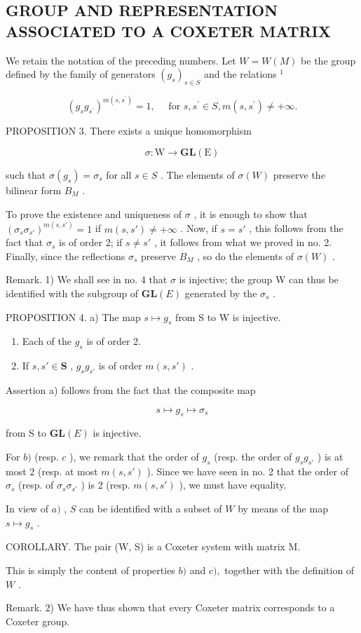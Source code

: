 \subsection{GROUP AND REPRESENTATION ASSOCIATED TO A COXETER MATRIX}

We retain the notation of the preceding numbers. Let \(W = W(M)\) be the group defined by the family of generators \((g_{s})_{s \in S}\) and the relations \(^{1}\)

\[
\left(g _ {s} g _ {s ^ {\prime}}\right) ^ {m \left(s, s ^ {\prime}\right)} = 1, \quad \text { for } s, s ^ {\prime} \in S, m \left(s, s ^ {\prime}\right) \neq + \infty .
\]

PROPOSITION 3. There exists a unique homomorphism

\[
\sigma : \mathrm{W} \rightarrow \mathbf {G L} (\mathrm{E})
\]

such that \(\sigma(g_s) = \sigma_s\) for all \(s \in S\) . The elements of \(\sigma(W)\) preserve the bilinear form \(B_M\) .

To prove the existence and uniqueness of \(\sigma\) , it is enough to show that \((\sigma_s \sigma_{s'})^{m(s, s')} = 1\) if \(m(s, s') \neq +\infty\) . Now, if \(s = s'\) , this follows from the fact that \(\sigma_s\) is of order 2; if \(s \neq s'\) , it follows from what we proved in no. 2. Finally, since the reflections \(\sigma_s\) preserve \(B_M\) , so do the elements of \(\sigma(W)\) .

Remark. 1) We shall see in no. 4 that \(\sigma\) is injective; the group W can thus be identified with the subgroup of \(\mathbf{GL}(E)\) generated by the \(\sigma_s\) .

PROPOSITION 4. a) The map \(s \mapsto g_s\) from S to W is injective.

\begin{enumerate}
\def\labelenumi{\alph{enumi})}
\setcounter{enumi}{1}
\item
  Each of the \(g_{s}\) is of order 2.
\item
  If \(s, s' \in \mathbf{S}\) , \(g_s g_{s'}\) is of order \(m(s, s')\) .
\end{enumerate}

Assertion a) follows from the fact that the composite map

\[
s \mapsto g _ {s} \mapsto \sigma_ {s}
\]

from S to \(\mathbf{GL}(E)\) is injective.

For \(b)\) (resp. \(c\) ), we remark that the order of \(g_{s}\) (resp. the order of \(g_{s}g_{s'}\) ) is at most 2 (resp. at most \(m(s, s')\) ). Since we have seen in no. 2 that the order of \(\sigma_{s}\) (resp. of \(\sigma_{s}\sigma_{s'}\) ) is 2 (resp. \(m(s, s')\) ), we must have equality.

In view of \(a)\) , \(S\) can be identified with a subset of \(W\) by means of the map \(s \mapsto g_s\) .

COROLLARY. The pair (W, S) is a Coxeter system with matrix M.

This is simply the content of properties \(b)\) and \(c),\) together with the definition of \(W\) .

Remark. 2) We have thus shown that every Coxeter matrix corresponds to a Coxeter group.

